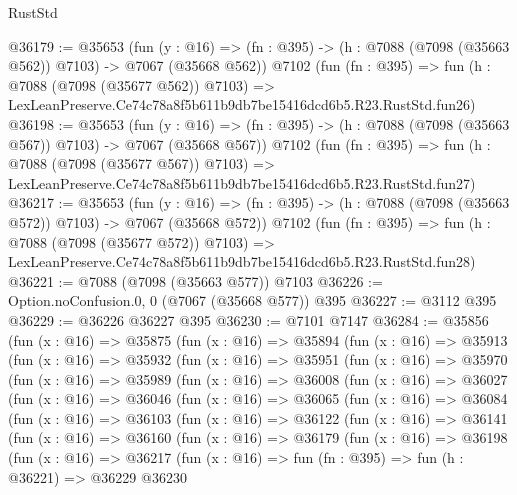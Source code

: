 \begin{lexlean}{RustStd}
\begin{coremodule}
@36179 := @35653
    (fun (y : @16) => (fn : @395) -> (h : @7088 (@7098 (@35663 @562)) @7103) -> @7067 (@35668 @562))
    @7102
    (fun (fn : @395) =>
    fun (h : @7088 (@7098 (@35677 @562)) @7103) =>
    LexLeanPreserve.Ce74c78a8f5b611b9db7be15416dcd6b5.R23.RustStd.fun26)
@36198 := @35653
    (fun (y : @16) => (fn : @395) -> (h : @7088 (@7098 (@35663 @567)) @7103) -> @7067 (@35668 @567))
    @7102
    (fun (fn : @395) =>
    fun (h : @7088 (@7098 (@35677 @567)) @7103) =>
    LexLeanPreserve.Ce74c78a8f5b611b9db7be15416dcd6b5.R23.RustStd.fun27)
@36217 := @35653
    (fun (y : @16) => (fn : @395) -> (h : @7088 (@7098 (@35663 @572)) @7103) -> @7067 (@35668 @572))
    @7102
    (fun (fn : @395) =>
    fun (h : @7088 (@7098 (@35677 @572)) @7103) =>
    LexLeanPreserve.Ce74c78a8f5b611b9db7be15416dcd6b5.R23.RustStd.fun28)
@36221 := @7088 (@7098 (@35663 @577)) @7103
@36226 := Option.noConfusion.{0, 0} (@7067 (@35668 @577)) @395
@36227 := @3112 @395
@36229 := @36226 @36227 @395
@36230 := @7101 @7147
@36284 := @35856
    (fun (x : @16) =>
    @35875
      (fun (x : @16) =>
      @35894
        (fun (x : @16) =>
        @35913
          (fun (x : @16) =>
          @35932
            (fun (x : @16) =>
            @35951
              (fun (x : @16) =>
              @35970
                (fun (x : @16) =>
                @35989
                  (fun (x : @16) =>
                  @36008
                    (fun (x : @16) =>
                    @36027
                      (fun (x : @16) =>
                      @36046
                        (fun (x : @16) =>
                        @36065
                          (fun (x : @16) =>
                          @36084
                            (fun (x : @16) =>
                            @36103
                              (fun (x : @16) =>
                              @36122
                                (fun (x : @16) =>
                                @36141
                                  (fun (x : @16) =>
                                  @36160
                                    (fun (x : @16) =>
                                    @36179
                                      (fun (x : @16) =>
                                      @36198
                                        (fun (x : @16) =>
                                        @36217
                                          (fun (x : @16) =>
                                          fun (fn : @395) =>
                                          fun (h : @36221) =>
                                          @36229
                                            @36230

\end{coremodule}
\end{lexlean}
